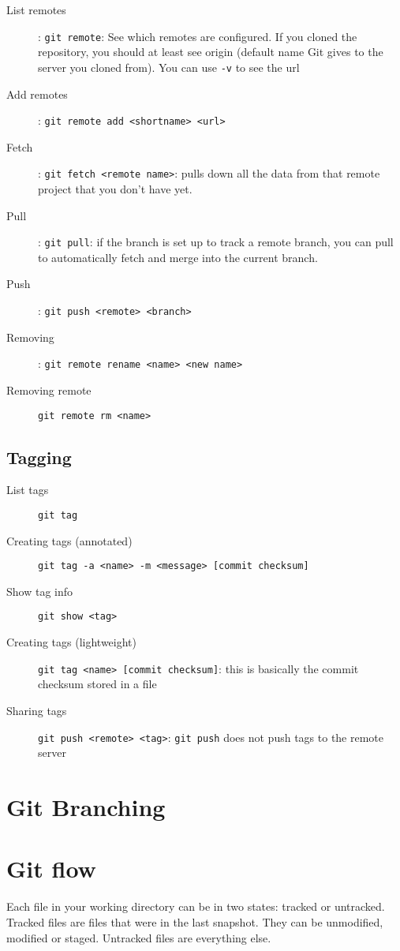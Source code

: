 \documentclass[french]{article}
\begin{document}
\begin{description}
    \item[List remotes]: \lstinline{git remote}: See which remotes are configured. If you cloned the repository, you should at least see origin (default name Git gives to the server you cloned from). You can use \lstinline{-v} to see the url
    \item[Add remotes]: \lstinline{git remote add <shortname> <url>}
    \item[Fetch]: \lstinline{git fetch <remote name>}: pulls down all the data from that remote project that you don't have yet.
    \item[Pull]: \lstinline{git pull}: if the branch is set up to track a remote branch, you can pull to automatically fetch and merge into the current branch.
    \item[Push]: \lstinline{git push <remote> <branch>}
    \item[Removing]: \lstinline{git remote rename <name> <new name>}
    \item[Removing remote] \lstinline{git remote rm <name>}
\end{description}

\subsection{Tagging}

\begin{description}
    \item[List tags] \lstinline{git tag}
    \item[Creating tags (annotated)] \lstinline{git tag -a <name> -m <message> [commit checksum]}
    \item[Show tag info] \lstinline{git show <tag>}
    \item[Creating tags (lightweight)] \lstinline{git tag <name> [commit checksum]}: this is basically the commit checksum stored in a file
    \item[Sharing tags] \lstinline{git push <remote> <tag>}: \lstinline{git push} does not push tags to the remote server
\end{description}

\section{Git Branching}


\section{Git flow}
Each file in your working directory can be in two states: tracked or untracked. Tracked files are files that were in the last snapshot. They can be unmodified, modified or staged. Untracked files are everything else.
\end{document}
